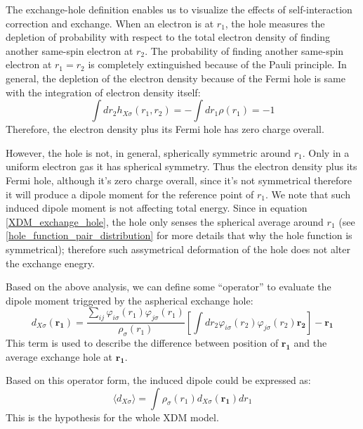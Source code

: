 The exchange-hole definition enables us to visualize the effects of self-interaction 
correction and exchange. When an electron is at $r_{1}$, the hole measures the depletion 
of probability with respect to the total electron density of finding another same-spin 
electron at $r_{2}$. The probability of finding
another same-spin electron at $r_{1} = r_{2}$ is completely extinguished because of the 
Pauli principle. In general, the depletion of the electron density because of the Fermi hole
is same with the integration of electron density itself:
\begin{equation}
 \label{XDM_eq:1}
\int dr_{2} h_{X\sigma}(r_{1},r_{2}) = -\int dr_{1} \rho(r_{1}) = -1
\end{equation}
Therefore, the electron density plus its Fermi hole has zero charge overall.

However, the hole is not, in general, spherically symmetric around $r_{1}$. Only in a uniform 
electron gas it has spherical symmetry. Thus the electron density plus its Fermi hole,
although it's zero charge overall, since it's not symmetrical therefore it will produce
a dipole moment for the reference point of $r_{1}$. We note that such induced dipole moment
is not affecting total energy. Since in equation \ref{XDM_exchange_hole}, the hole only
senses the spherical average around $r_{1}$ (see \ref{hole_function_pair_distribution} 
for more details that why the hole function is symmetrical); therefore such assymetrical
deformation of the hole does not alter the exchange enegry.

Based on the above analysis, we can define some ``operator'' to evaluate the dipole 
moment triggered by the aspherical exchange hole:
\begin{equation}
 \label{XDM_model}
d_{X\sigma}(\bm{r_{1}}) = 
\frac{
\sum_{ij}\varphi_{i\sigma}(r_{1})\varphi_{j\sigma}(r_{1})}{\rho_{\sigma}(r_{1})}
\left[ \int dr_{2} \varphi_{i\sigma}(r_{2})
\varphi_{j\sigma}(r_{2}) \bm{r_{2}} \right] - \bm{r_{1}}
\end{equation}
This term is used to describe the difference between position of $\bm{r_{1}}$ and
the average exchange hole at $\bm{r_{1}}$. 

Based on this operator form, the induced dipole could be expressed as:
\begin{equation}
\label{XDM_eq:0}
 \langle d_{X\sigma}\rangle = \int \rho_{\sigma}(r_{1})d_{X\sigma}(\bm{r_{1}}) dr_{1}
\end{equation}
This is the hypothesis for the whole XDM model.

